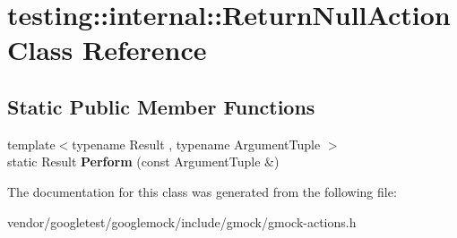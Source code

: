 \hypertarget{classtesting_1_1internal_1_1ReturnNullAction}{}\section{testing\+:\+:internal\+:\+:Return\+Null\+Action Class Reference}
\label{classtesting_1_1internal_1_1ReturnNullAction}
\subsection*{Static Public Member Functions}
\begin{DoxyCompactItemize}
\item 
{\footnotesize template$<$typename Result , typename Argument\+Tuple $>$ }\\static Result {\bfseries Perform} (const Argument\+Tuple \&)\hypertarget{classtesting_1_1internal_1_1ReturnNullAction_a6ce1fba236686df93070320b399e4f32}{}\label{classtesting_1_1internal_1_1ReturnNullAction_a6ce1fba236686df93070320b399e4f32}

\end{DoxyCompactItemize}


The documentation for this class was generated from the following file\+:\begin{DoxyCompactItemize}
\item 
vendor/googletest/googlemock/include/gmock/gmock-\/actions.\+h\end{DoxyCompactItemize}
